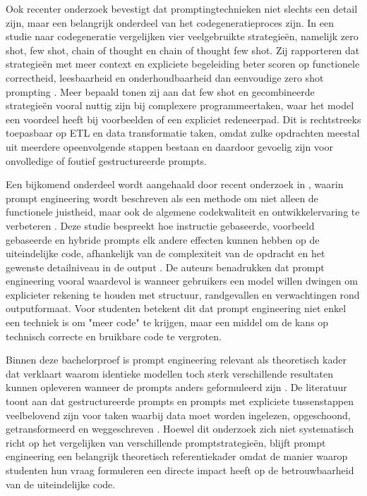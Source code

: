 Ook recenter onderzoek bevestigt dat promptingtechnieken niet slechts een detail zijn, maar een belangrijk onderdeel van het codegeneratieproces zijn. In een studie naar codegeneratie vergelijken \textcite{Yuen2025} vier veelgebruikte strategieën, namelijk zero shot, few shot, chain of thought en chain of thought few shot. Zij rapporteren dat strategieën met meer context en expliciete begeleiding beter scoren op functionele correctheid, leesbaarheid en onderhoudbaarheid dan eenvoudige zero shot prompting \autocite{Yuen2025}. Meer bepaald tonen zij aan dat few shot en gecombineerde strategieën vooral nuttig zijn bij complexere programmeertaken, waar het model een voordeel heeft bij voorbeelden of een expliciet redeneerpad. Dit is rechtstreeks toepasbaar op ETL en data transformatie taken, omdat zulke opdrachten meestal uit meerdere opeenvolgende stappen bestaan en daardoor gevoelig zijn voor onvolledige of foutief gestructureerde prompts.

Een bijkomend onderdeel wordt aangehaald door recent onderzoek in \textcite{Yang2025}, waarin prompt engineering wordt beschreven als een methode om niet alleen de functionele juistheid, maar ook de algemene codekwaliteit en ontwikkelervaring te verbeteren \autocite{Yang2025}. Deze studie bespreekt hoe instructie gebaseerde, voorbeeld gebaseerde en hybride prompts elk andere effecten kunnen hebben op de uiteindelijke code, afhankelijk van de complexiteit van de opdracht en het gewenste detailniveau in de output \autocite{Yang2025}. De auteurs benadrukken dat prompt engineering vooral waardevol is wanneer gebruikers een model willen dwingen om explicieter rekening te houden met structuur, randgevallen en verwachtingen rond outputformaat. Voor studenten betekent dit dat prompt engineering niet enkel een techniek is om "meer code" te krijgen, maar een middel om de kans op technisch correcte en bruikbare code te vergroten.

Binnen deze bachelorproef is prompt engineering relevant als theoretisch kader dat verklaart waarom identieke modellen toch sterk verschillende resultaten kunnen opleveren wanneer de prompts anders geformuleerd zijn \autocite{Guo2024,Yuen2025}. De literatuur toont aan dat gestructureerde prompts en prompts met expliciete tussenstappen veelbelovend zijn voor taken waarbij data moet worden ingelezen, opgeschoond, getransformeerd en weggeschreven \autocite{Yuen2025,Yang2025}. Hoewel dit onderzoek zich niet systematisch richt op het vergelijken van verschillende promptstrategieën, blijft prompt engineering een belangrijk theoretisch referentiekader omdat de manier waarop studenten hun vraag formuleren een directe impact heeft op de betrouwbaarheid van de uiteindelijke code.

